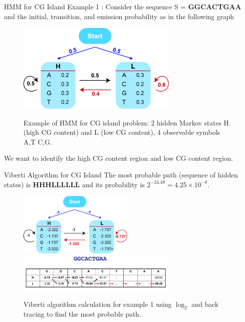 \documentclass{beamer}
\begin{document}
\begin{frame}{HMM for CG Island}
	Example 1 \cite{borodovsky2006problems}: Consider the sequence S = \textbf{GGCACTGAA} and the initial, transition, and emission probability as in the following graph
	\begin{figure}
		\centering
		\includegraphics[width = 0.7\textwidth]{example1.jpg}
		\label{fig:example1}
		\caption{Example of HMM for CG island problem: 2 hidden Markov states H (high CG content) and L (low CG content), 4 observable symbols A,T C,G.}
	\end{figure}
	We want to identify the high CG content region and low CG content region.
\end{frame} 

\begin{frame}{Viberti Algorithm for CG Island}
	 The most probable path (sequence of hidden states) is \textbf{HHHLLLLLL} and its probability is $2^{-24.49} = 4.25 \times 10^{-8}$.
	\begin{figure}
		\centering
		\includegraphics[width = 0.5\textwidth]{example1log.jpg}
		\includegraphics[width = 0.7\textwidth]{example1cal.png}
		\label{fig:example2cal}
		\caption{Viberti algorithm calculation for example 1 using $\log_2$ and back tracing to find the most probable path.}
	\end{figure}
\end{frame}
\end{document}
